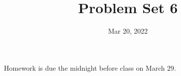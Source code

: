 \documentclass[12pt]{article}
\begin{document}
\newcommand{\skipp}{\textrm{skip}}
\newcommand{\boxprod}{\mathop{\square}}
\newcommand{\Set}{\textrm{Set}}
\newcommand{\Cat}{\textrm{Cat}}
\newcommand{\Cayley}{\textrm{Cayley}}
\newcommand{\Preds}{\mathcal{P}}
\newcommand{\triple}[3]{\{#1\}{#2}\{#3\}}
\newcommand{\Triple}{\textrm{Triple}}
\newcommand{\Analyse}{\textrm{Analyse}}
\newcommand{\command}{\textrm{command}}

\newcommand{\id}{\textrm{id}}
\newcommand{\cat}{\mathbb}

\newcommand{\isatype}{\,\,\textrm{type}}
\newcommand{\matchZero}{\textrm{match}_0}
\newcommand{\matchSum}[3]{\textrm{match}_+ {#1}\{{#2}\}\{{#3}\}}

\title{Problem Set 6}
\date{Mar 20, 2022}
\maketitle

Homework is due the midnight before class on March 29.
\end{document}
